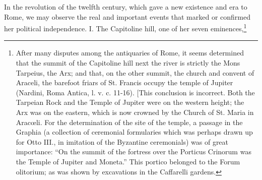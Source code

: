 In the revolution of the twelfth century, which gave a new existence and era to Rome, we may observe the real and important events that marked or confirmed her political independence. I. The Capitoline hill, one of her seven eminences,\footnote{After many disputes among the antiquaries of Rome, it seems determined that the summit of the Capitoline hill next the river is strictly the Mons Tarpeius, the Arx; and that, on the other summit, the church and convent of Araceli, the barefoot friars of St. Francis occupy the temple of Jupiter (Nardini, Roma Antica, l. v. c. 11-16). [This conclusion is incorrect. Both the Tarpeian Rock and the Temple of Jupiter were on the western height; the Arx was on the eastern, which is now crowned by the Church of St. Maria in Aracœli. For the determination of the site of the temple, a passage in the Graphia (a collection of ceremonial formularies which was perhaps drawn up for Otto III., in imitation of the Byzantine ceremonials) was of great importance: \texthebrew{“}On the summit of the fortress over the Porticus Crinorum was the Temple of Jupiter and Moneta.\texthebrew{}” This portico belonged to the Forum olitorium; as was shown by excavations in the Caffarelli gardens.

}
